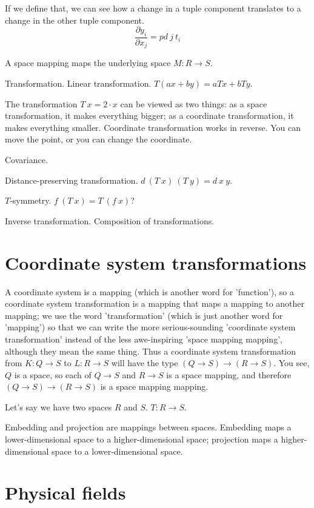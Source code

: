 If we define that, we can see how a change in a tuple component translates
to a change in the other tuple component.
\[
\frac{\partial y_i}{\partial x_j} = pd~j~t_i
\]

A space mapping maps the underlying space $M : R \to S$.

Transformation.
Linear transformation.
$T(ax+by) = aTx + bTy$.

The transformation $T~x = 2\cdot x$ can be viewed as two things:
as a space transformation, it makes everything bigger;
as a coordinate transformation, it makes everything smaller.
Coordinate transformation works in reverse.
You can move the point, or you can change the coordinate.

Covariance.

Distance-preserving transformation.
$d~(T~x)~(T~y) = d~x~y$.

$T$-symmetry.
$f~(T~x) = T~(f~x)$?

Inverse transformation.
Composition of transformations.

\section{Coordinate system transformations}

A coordinate system is a mapping (which is another word for 'function'),
so a coordinate system transformation is a mapping that maps a mapping to another mapping;
we use the word 'transformation' (which is just another word for 'mapping') so that
we can write the more serious-sounding 'coordinate system transformation'
instead of the less awe-inspiring 'space mapping mapping',
although they mean the same thing.
Thus a coordinate system transformation
from $K : Q \to S$ to $L : R \to S$ will have the type
$(Q \to S) \to (R \to S)$.
You see, $Q$ is a space,
so each of $Q \to S$ and $R \to S$ is a space mapping,
and therefore $(Q \to S) \to (R \to S)$ is a space mapping mapping.

Let's say we have two spaces $R$ and $S$.
$T : R \to S$.

Embedding and projection are mappings between spaces.
Embedding maps a lower-dimensional space to a higher-dimensional space;
projection maps a higher-dimensional space to a lower-dimensional space.

\section{Physical fields}

